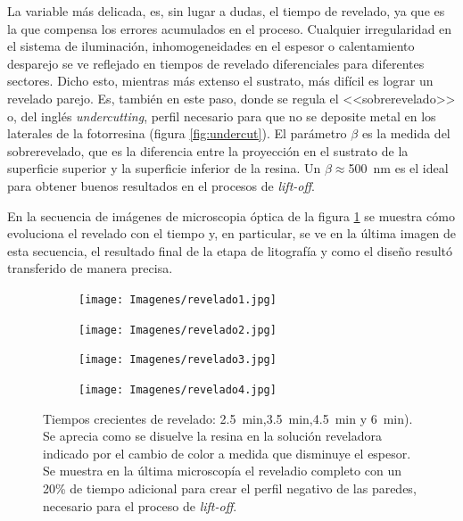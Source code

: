 { 	   		 La variable más delicada, es, sin lugar a dudas, el tiempo de revelado, ya que es la que compensa los errores acumulados en el proceso. Cualquier irregularidad en el sistema de iluminación, inhomogeneidades en el espesor o calentamiento desparejo se ve reflejado en tiempos de revelado diferenciales para diferentes sectores. Dicho esto, mientras más extenso el sustrato, más difícil es lograr un revelado parejo. Es, también en este paso, donde se regula el <<sobrerevelado>> o, del inglés \textit{undercutting}, perfil necesario para que no se deposite metal en los laterales de la fotorresina (figura \ref{fig:undercut}). El parámetro $\beta$ es la medida del sobrerevelado, que es la diferencia entre la proyección en el sustrato de la superficie superior y la superficie inferior de la resina. Un $\beta\!\!\approx$\SI{500}{\nm} es el ideal para obtener buenos resultados en el procesos de \textit{lift-off}. 
 
 	         En la secuencia de imágenes de microscopia óptica de la figura \ref{fig:revelado} se muestra cómo evoluciona el revelado con el tiempo y, en particular, se ve en la última imagen de esta secuencia, el resultado final de la etapa de litografía y como el diseño resultó transferido de manera precisa.

 				\begin{figure}[th!]
			 	   	    \centering
			 	   	    \begin{subfigure}[t]{0.495\textwidth}
			        	\texttt{[image: Imagenes/revelado1.jpg]}
			       		\end{subfigure}
			     		\begin{subfigure}[t]{0.495\textwidth}
			     		\texttt{[image: Imagenes/revelado2.jpg]}
			    		\end{subfigure}
			     		\begin{subfigure}[t]{0.495\textwidth}
						\vspace*{-0.3cm}
			     		\texttt{[image: Imagenes/revelado3.jpg]}
			        	\end{subfigure}
						\begin{subfigure}[t]{0.495\textwidth}
			     		\vspace*{-0.3cm}
			     		\texttt{[image: Imagenes/revelado4.jpg]}
			        	\end{subfigure}
			     		\caption[Revelado en función del tiempo]{Tiempos crecientes de revelado: \SI{2.5}{min},\SI{3.5}{min},\SI{4.5}{min} y \SI{6}{min}). Se aprecia como se disuelve la resina en la solución reveladora indicado por el cambio de color a medida que disminuye el espesor. Se muestra en la última microscopía el reveladio completo con un 20\% de tiempo adicional para crear el perfil negativo de las paredes, necesario para el proceso de\textit{ lift-off}.}
			     		\label{fig:revelado}
			     	   	\end{figure}

}
